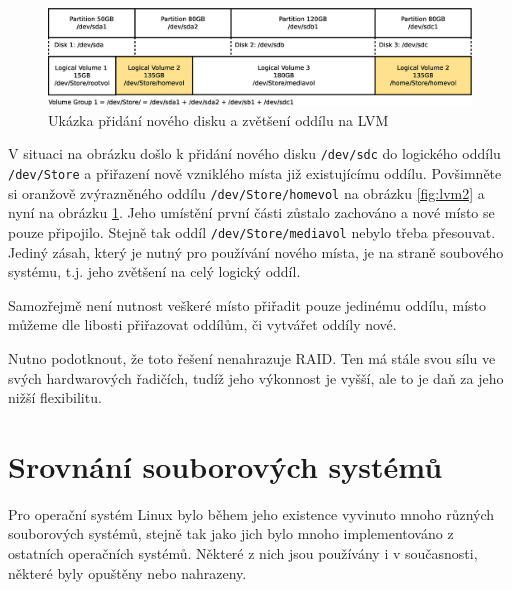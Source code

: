 \begin{figure}[] 
    \centering
    \includegraphics[scale=0.32]{obrazky/lvm3.eps}
    \caption{Ukázka přidání nového disku a zvětšení oddílu na LVM}
    \label{fig:lvm3}
\end{figure}V situaci na obrázku došlo k přidání nového disku \texttt{/dev/sdc} do logického oddílu \texttt{/dev/Store} a přiřazení nově vzniklého místa již existujícímu oddílu. Povšimněte si oranžově zvýrazněného oddílu \texttt{/dev/Store/homevol} na obrázku \ref{fig:lvm2} a nyní na obrázku \ref{fig:lvm3}. Jeho umístění první části zůstalo zachováno a nové místo se pouze připojilo. Stejně tak oddíl \texttt{/dev/Store/mediavol} nebylo třeba přesouvat. Jediný zásah, který je nutný pro používání nového místa, je na straně soubového systému, t.j. jeho zvětšení na celý logický oddíl.

Samozřejmě není nutnost veškeré místo přiřadit pouze jedinému oddílu, místo můžeme dle libosti přiřazovat oddílům, či vytvářet oddíly nové.

Nutno podotknout, že toto řešení nenahrazuje RAID. Ten má stále svou sílu ve svých hardwarových řadičích, tudíž jeho výkonnost je vyšší, ale to je daň za jeho nižší flexibilitu.

\section{Srovnání souborových systémů}
Pro operační systém Linux bylo během jeho existence vyvinuto mnoho různých souborových systémů, stejně tak jako jich bylo mnoho implementováno z ostatních operačních systémů. Některé z nich jsou používány i v současnosti, některé byly opuštěny nebo nahrazeny.

